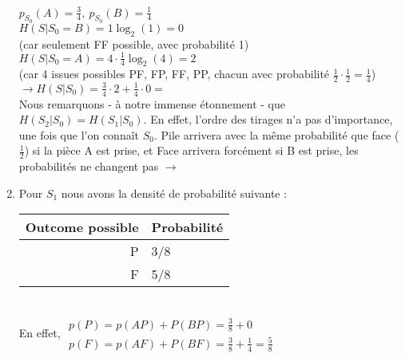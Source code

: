 \documentclass[10pt,a4paper]{article}
\begin{document}
\begin{enumerate}
		$p_{S_0}(A) = \frac{3}{4}, \ p_{S_0}(B) = \frac{1}{4}$\\
		$H(S|S_0=B) = 1\log_2(1) = 0$\\
		(car seulement FF possible, avec probabilité 1)\\
		$H(S|S_0 =A) = 4\cdot\frac{1}{4}\log_2(4) = 2$\\
		(car 4 issues possibles PF, FP, FF, PP, chacun avec probabilité $\frac{1}{2}\cdot\frac{1}{2} = \frac{1}{4}$)
		$\to H(S|S_0) = \frac{3}{4}\cdot2+\frac{1}{4}\cdot0 =$  
		\\
		Nous remarquons - à notre immense étonnement - que $H(S_2|S_0) = H(S_1|S_0)$. En effet, l'ordre des tirages n'a pas d'importance, une fois que l'on connaît $S_0$. Pile arrivera avec la même probabilité que face ($\frac{1}{2}$) si la pièce A est prise, et Face arrivera forcément si B est prise, les probabilités ne changent pas $\to$ 
	\item Pour $S_1$ nous avons la densité de probabilité suivante :
		\begin{tabular}{r|l}
			Outcome possible & Probabilité\\
				\hline
			P & 3/8\\
			F & 5/8
		\end{tabular}\\
		En effet, $\begin{array}{l}
		p(P) = p(AP) + P(BP) = \frac{3}{8} + 0\\
		p(F) = p(AF) + P(BF) = \frac{3}{8} +  \frac{1}{4} = \frac{5}{8}
		\end{array}$
		

\end{enumerate}
\end{document}
